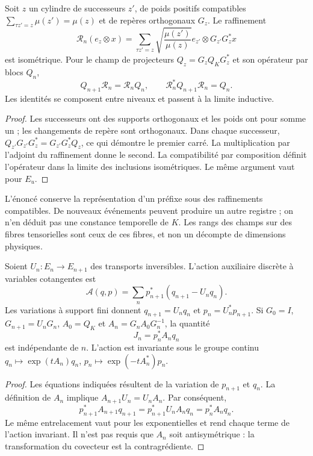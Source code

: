 \begin{proposition}
\label{lib01:refinamiento}
Soit \(z\) un cylindre de successeurs \(z'\), de poids positifs compatibles
\(\sum_{\tau z'=z}\mu(z')=\mu(z)\) et de repères orthogonaux \(G_z\).
Le raffinement
\[
 \mathcal R_n(e_z\otimes x)=
 \sum_{\tau z'=z}\sqrt{\frac{\mu(z')}{\mu(z)}}
 e_{z'}\otimes G_{z'}G_z^*x
\]
est isométrique. Pour le champ de projecteurs
\(Q_z=G_zQ_KG_z^*\) et son opérateur par blocs \(Q_n\),
\[
 Q_{n+1}\mathcal R_n=\mathcal R_nQ_n,
 \qquad \mathcal R_n^*Q_{n+1}\mathcal R_n=Q_n.
\]
Les identités se composent entre niveaux et passent à la limite inductive.
\end{proposition}
\begin{proof}
Les successeurs ont des supports orthogonaux et les poids ont pour somme un ; les changements
de repère sont orthogonaux. Dans chaque successeur,
\(Q_{z'}G_{z'}G_z^*=G_{z'}G_z^*Q_z\), ce qui démontre le premier
carré. La multiplication par l’adjoint du raffinement donne le second.
La compatibilité par composition définit l’opérateur dans la limite des
inclusions isométriques. Le même argument vaut pour \(E_u\).
\end{proof}

L’énoncé conserve la représentation d’un préfixe sous des raffinements
compatibles. De nouveaux événements peuvent produire un autre registre ; on n’en déduit pas
une constance temporelle de \(K\). Les rangs des champs sur des fibres
tensorielles sont ceux de ces fibres, et non un décompte de dimensions physiques.

\begin{proposition}
\label{lib01:carga-noether}
Soient \(U_n:E_n\to E_{n+1}\) des transports inversibles. L’action
auxiliaire discrète à variables cotangentes est
\[
 \mathcal A(q,p)=\sum_n p_{n+1}^*(q_{n+1}-U_nq_n).
\]
Les variations à support fini donnent
\(q_{n+1}=U_nq_n\) et \(p_n=U_n^*p_{n+1}\). Si
\(G_0=I\), \(G_{n+1}=U_nG_n\), \(A_0=Q_K\) et
\(A_n=G_nA_0G_n^{-1}\), la quantité
\[
 J_n=p_n^*A_nq_n
\]
est indépendante de \(n\). L'action est invariante sous le groupe continu \(q_n\mapsto\exp(tA_n)q_n\), \(p_n\mapsto\exp(-tA_n^*)p_n\).
\end{proposition}
\begin{proof}
Les équations indiquées résultent de la variation de \(p_{n+1}\) et \(q_n\).
La définition de \(A_n\) implique
\(A_{n+1}U_n=U_nA_n\). Par conséquent,
\[
 p_{n+1}^*A_{n+1}q_{n+1}
 =p_{n+1}^*U_nA_nq_n=p_n^*A_nq_n.
\]
Le même entrelacement vaut pour les exponentielles et rend chaque terme de l'action invariant. Il n'est pas requis que \(A_n\) soit antisymétrique : la transformation du covecteur est la contragrédiente.
\end{proof}

